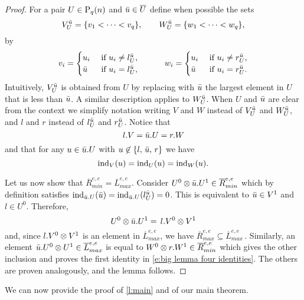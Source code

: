 \begin{proof}
	For a pair $U \in \P_q(n)$ and $\bu \in \overline{U}$ define when possible the sets
	\begin{equation*}
	V^\bu_U = \{v_1 < \cdots < v_q\}, \qquad W_U^\bu = \{w_1 < \cdots < w_q\},
	\end{equation*}
	by
	\begin{align*}
	v_i =
	\begin{cases}
	u_i & \text{ if } u_i \neq l_U^\bu, \\
	\bu	& \text{ if } u_i = l_U^\bu,
	\end{cases}
	\qquad \quad
	w_i =
	\begin{cases}
	u_i & \text{ if } u_i \neq r_U^\bu, \\
	\bu	& \text{ if } u_i = r_U^\bu.
	\end{cases}
	\end{align*}
	Intuitively, $V_U^\bu$ is obtained from $U$ by replacing with $\bu$ the largest element in $U$ that is less than $\bu$.
	A similar description applies to $W_U^\bu$.
	When $U$ and $\bu$ are clear from the context we simplify notation writing $V$ and $W$ instead of $V^\bu_U$ and $W^\bu_U$, and $l$ and $r$ instead of $l_U^\bu$ and $r_U^\bu$.
	Notice that
	\begin{equation*}
	l.V = \bu.U = r.W
	\end{equation*}
	and that for any $u \in \bu.U$ with $u \not \in \{l,\, \bu,\, r\}$ we have
	\begin{equation*}
	\ind_{V}(u) = \ind_{U}(u) = \ind_{W}(u).
	\end{equation*}

	Let us now show that $\overline{R}_{min}^{e,e} = \overline{L}_{max}^{e,e}$.
	Consider $U^0 \ot \bu.U^1 \in \overline{R}_{min}^{e, e}$ which by definition satisfies $\ind_{\bu.U}(\bu) = \ind_{\bu.U}(l_{U}^\bu) = 0$.
	This is equivalent to $\bu \in V^1$ and $l \in U^0$.
	Therefore,
	\begin{equation*}
	U^0 \ot \bu.U^1 = \, l.V^0 \ot V^1
	\end{equation*}
	and, since $l.V^0 \ot V^1$ is an element in $\overline{L}_{max}^{e,e}$, we have $\overline{R}_{max}^{e,e} \subseteq \overline{L}_{max}^{e,e}$\,.
	Similarly, an element $\bu.U^0 \ot U^1 \in \overline{L}_{max}^{e,e}$ is equal to $W^0 \ot r.W^1 \in \overline{R}_{min}^{e,e}$ which gives the other inclusion and proves the first identity in \eqref{e:big lemma four identities}.
	The others are proven analogously, and the lemma follows.
\end{proof}

We can now provide the proof of \cref{l:main} and of our main theorem.

